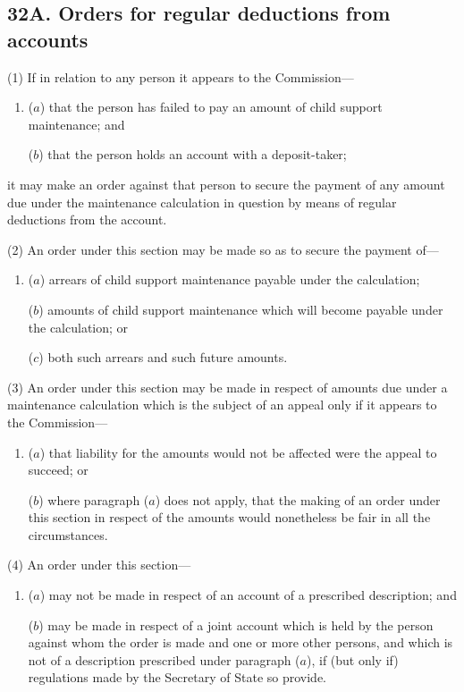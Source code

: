 \documentclass[12pt,a4paper]{article}
\begin{document}
\subsection{32A. Orders for regular deductions from accounts}

(1) If in relation to any person it appears to the Commission---
\begin{enumerate}\item[]
($a$) that the person has failed to pay an amount of child support maintenance;
and

($b$) that the person holds an account with a deposit-taker;
\end{enumerate}
it may make an order against that person to secure the payment of any amount due under the maintenance calculation in question by means of regular deductions from the account.

(2) An order under this section may be made so as to secure the payment of---
\begin{enumerate}\item[]
($a$) arrears of child support maintenance payable under the calculation;

($b$) amounts of child support maintenance which will become payable under the
calculation; or

($c$) both such arrears and such future amounts.
\end{enumerate}

\begin{sloppypar}
(3) An order under this section may be made in respect of amounts due under a maintenance calculation which is the subject of an appeal only if it appears to the Commission---
\end{sloppypar}
\begin{enumerate}\item[]
($a$) that liability for the amounts would not be affected were the appeal to succeed;
or

($b$) where paragraph ($a$) does not apply, that the making of an order under this
section in respect of the amounts would nonetheless be fair in all the
circumstances.
\end{enumerate}

(4) An order under this section---
\begin{enumerate}\item[]
($a$) may not be made in respect of an account of a prescribed description; and

($b$) may be made in respect of a joint account which is held by the person against whom the order is made and one or more other persons, and which is not of a description prescribed under paragraph ($a$), if (but only if) regulations made by the Secretary of State so provide.
\end{enumerate}
\end{document}
